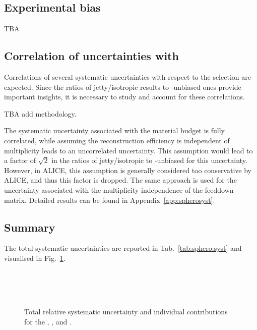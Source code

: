 \subsection{Experimental bias}

TBA

\subsection{Correlation of uncertainties with \SOPT}

Correlations of several systematic uncertainties with respect to the \SOPT selection are expected. Since the ratios of jetty/isotropic results to \SOPT-unbiased ones provide important insights, it is necessary to study and account for these correlations.

TBA add methodology.

The systematic uncertainty associated with the material budget is fully correlated, while assuming the reconstruction efficiency is independent of multiplicity leads to an uncorrelated uncertainty. This assumption would lead to a factor of $\sqrt{2}$ in the ratios of jetty/isotropic to \SOPT-unbiased for this uncertainty. However, in ALICE, this assumption is generally considered too conservative by ALICE, and thus this factor is dropped. The same approach is used for the uncertainty associated with the multiplicity independence of the feeddown matrix. Detailed results can be found in Appendix~\ref{app:spherosyst}.


\subsection{Summary}

The total systematic uncertainties are reported in Tab.~\ref{tab:sphero:syst} and visualised in Fig.~\ref{fig:sphero:systtot}.

\begin{figure}[!h]
\centering
{}\\
\\
\\
\caption{Total relative systematic uncertainty and individual contributions for the \KOs, \LA, and \AL .}
\label{fig:sphero:systtot}
\end{figure}

